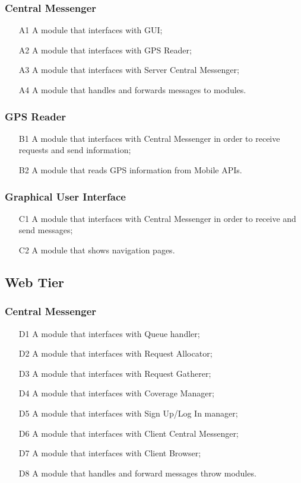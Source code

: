 \subsubsection{Central Messenger}
\begin{itemize}
\item [A1] A module that interfaces with GUI;
\item [A2] A module that interfaces with GPS Reader;
\item [A3] A module that interfaces with Server Central Messenger;
\item [A4] A module that handles and forwards messages to modules.
\end{itemize}

\subsubsection{GPS Reader}
\begin{itemize}
\item [B1] A module that interfaces with Central Messenger in order to receive requests and send information;
\item [B2] A module that reads GPS information from Mobile APIs.
\end{itemize}

\subsubsection{Graphical User Interface}
\begin{itemize}
\item [C1] A module that interfaces with Central Messenger in order to receive and send messages;
\item [C2] A module that shows navigation pages.
\end{itemize}

\subsection{Web Tier}
\subsubsection{Central Messenger}
\begin{itemize}
\item [D1] A module that interfaces with Queue handler;
\item [D2] A module that interfaces with Request Allocator;
\item [D3] A module that interfaces with Request Gatherer;
\item [D4] A module that interfaces with Coverage Manager;
\item [D5] A module that interfaces with Sign Up/Log In manager;
\item [D6] A module that interfaces with Client Central Messenger;
\item [D7] A module that interfaces with Client Browser;
\item [D8] A module that handles and forward messages throw modules.
\end{itemize}


